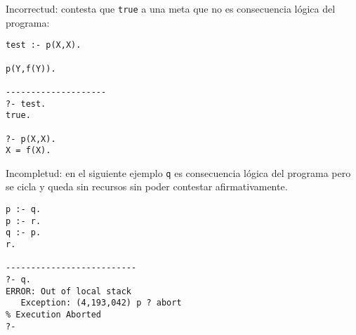 \documentclass[11pt,letterpaper]{article}
\begin{document}
\bi

\item Incorrectud: {\pl} contesta que \verb-true- a una meta que no es 
consecuencia l\'ogica del programa:
\begin{verbatim}
test :- p(X,X).

p(Y,f(Y)).

--------------------
?- test.
true.

?- p(X,X).
X = f(X).
\end{verbatim}

\item Incompletud: en el siguiente ejemplo \verb-q- es consecuencia l\'ogica 
del programa pero {\pl} se cicla y queda sin recursos sin poder contestar 
afirmativamente.
\begin{verbatim}
p :- q.
p :- r.
q :- p.
r.

--------------------------
?- q.
ERROR: Out of local stack
   Exception: (4,193,042) p ? abort
% Execution Aborted
?- 
\end{verbatim}

\ei
\end{document}
